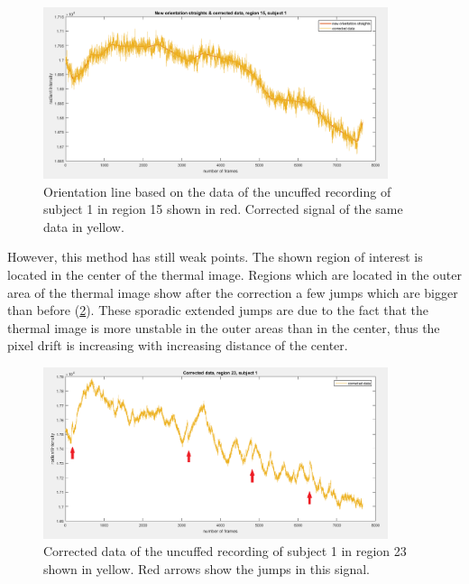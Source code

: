 \begin{figure}[H]
	\includegraphics[width=0.9\textwidth]{figures/corr15}
	\caption{Orientation line based on the data of the uncuffed recording of subject 1 in region 15 shown in red. Corrected signal of the same data in yellow.}
	\label{fig:corr15}
\end{figure}
However, this method has still weak points. The shown region of interest is located in the center of the thermal image. Regions which are located in the outer area of the thermal image show after the correction a few jumps which are bigger than before (\ref{fig:corr23}). These sporadic extended jumps are due to the fact that the thermal image is more unstable in the outer areas than in the center, thus the pixel drift is increasing with increasing distance of the center.
\begin{figure}[H]
	\includegraphics[width=0.9\textwidth]{figures/corr23pfeile}
	\caption{Corrected data of the uncuffed recording of subject 1 in region 23 shown in yellow. Red arrows show the jumps in this signal.}
	\label{fig:corr23}
\end{figure}